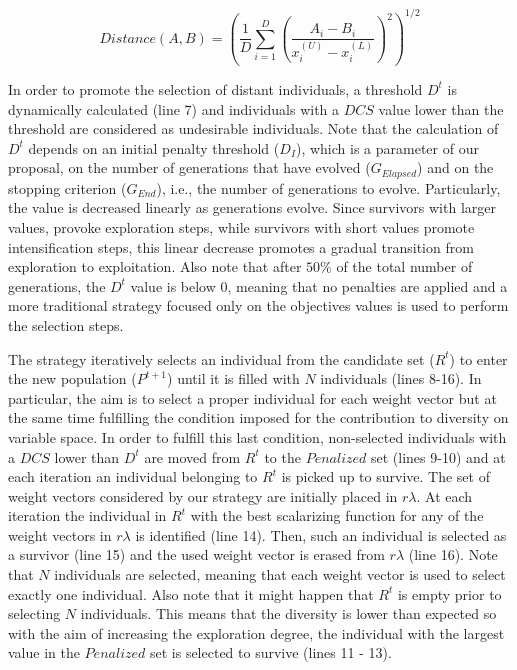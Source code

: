 \begin{equation}\label{eqn:distance}
Distance(A, B) =   \left ( \frac{1}{D}  \sum_{i=1}^D \left ( \frac{A_i - B_i}{x_i^{(U)} - x_i^{(L)}} \right )^2  \right)^{1/2}
\end{equation}

In order to promote the selection of distant individuals, a threshold $D^t$ is dynamically calculated (line 7) and 
individuals with a $DCS$ value lower than the threshold are considered as undesirable individuals.
%
Note that the calculation of $D^t$ depends on an initial penalty threshold ($D_I$), which is a parameter of our proposal,
on the number of generations that have evolved ($G_{Elapsed}$) and on the stopping criterion ($G_{End}$), i.e., the number of
generations to evolve.
%
Particularly, the value is decreased linearly as generations evolve.
%
Since survivors with larger \DCS{} values, provoke exploration steps, while survivors with short \DCS{} values promote
intensification steps, this linear decrease promotes
a gradual transition from exploration to exploitation.
%
Also note that after $50\%$ of the total number of generations, the $D^t$ value is below 0, 
meaning that no penalties are applied and a more traditional strategy focused only on the objectives values
is used to perform the selection steps.

The strategy iteratively selects an individual from the candidate set ($R^t$) to enter the new population ($P^{t+1}$) until
it is filled with $N$ individuals (lines 8-16).
%
In particular, the aim is to select a proper individual for each weight vector but at the same time fulfilling
the condition imposed for the contribution to diversity on variable space.
%
In order to fulfill this last condition, non-selected individuals with a $DCS$
lower than $D^t$ are moved from $R^t$ to the $Penalized$ set (lines 9-10) and at each iteration
an individual belonging to $R^t$ is picked up to survive.
%
The set of weight vectors considered by our strategy are initially placed in $r\lambda$.
%
At each iteration the individual in $R^t$ with the best scalarizing function for any of the weight vectors in
$r\lambda$ is identified (line 14).
%
Then, such an individual is selected as a survivor (line 15) and the used weight vector is erased
from $r\lambda$ (line 16).
%
Note that $N$ individuals are selected, meaning that each weight vector is used to select exactly one individual.
%
Also note that it might happen that $R^t$ is empty prior to selecting $N$ individuals.
%
This means that the diversity is lower than expected so
with the aim of increasing the exploration degree, the individual with the largest \DCS{} value in
the $Penalized$ set is selected to survive (lines 11 - 13).

